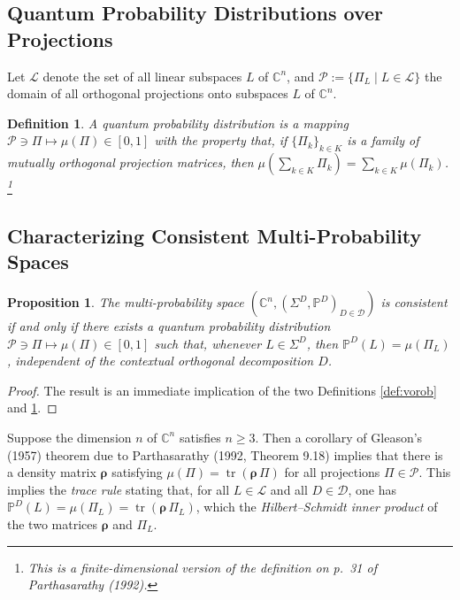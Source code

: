 \documentclass[11pt]{article}
\newcommand \C { \mathbb{C} }
\DeclareMathOperator{\tr}{tr}
\newtheorem{proposition}[theorem]{Proposition}
\newtheorem{definition}[theorem]{Definition}
\begin{document}
\subsection{Quantum Probability Distributions over Projections}

Let $ \mathcal L$ denote the set of all linear subspaces $L$ of $ \C^n $,
and $ \mathscr P := \{ \Pi _L \mid L \in \mathcal L \} $ the domain 
of all orthogonal projections onto subspaces $L$ of $ \C^n $.

\begin{definition} \label{def:quantProb}
A \emph{quantum probability distribution} is a mapping 
 \( \mathscr P \owns \Pi \mapsto \mu ( \Pi ) \in [0, 1] \) with the property that,
	if $ \{ \Pi _k \}_{k \in K} $ is a family of mutually orthogonal projection matrices, 
	then $ \mu \left( \sum _{k \in K} \Pi _k \right) = \sum _{k \in K} \mu ( \Pi _k ) $.%
%
\footnote{This is a finite-dimensional version
of the definition on p.~31 of Parthasarathy (1992).}
%
\end{definition}

\subsection{Characterizing Consistent Multi-Probability Spaces}

\begin{proposition}
	The multi-probability space \( ( \C^n, ( \Sigma ^D, \mathbb P^D )_{D \in \mathcal D}) \)
	is consistent if and only if there exists a quantum probability distribution
	 \( \mathscr P \owns \Pi \mapsto \mu ( \Pi ) \in [0, 1] \)
	such that, whenever $L \in \Sigma ^D $, then $ \mathbb P^D (L) = \mu ( \Pi _L )$,
	independent of the contextual orthogonal decomposition $D$.
\end{proposition}

\begin{proof}
	The result is an immediate implication 
	of the two Definitions \ref{def:vorob} and \ref{def:quantProb}.
\end{proof}

Suppose the dimension $n$ of $ \C^n $ satisfies $n \ge 3$.
Then a corollary of Gleason's (1957) theorem due to Parthasarathy (1992, Theorem 9.18)
implies that there is a density matrix $ \boldsymbol \rho $ 
satisfying $ \mu ( \Pi ) = \tr ( \boldsymbol \rho \, \Pi )$ 
for all projections $ \Pi \in \mathscr P$.
This implies the \emph{trace rule} stating that,
for all $L \in \mathcal L$ and all $D \in \mathcal D$, 
one has $ \mathbb P^D (L) = \mu ( \Pi _L ) = \tr ( \boldsymbol \rho \, \Pi _L ) $,
which the \emph{Hilbert--Schmidt inner product} 
of the two matrices $ \boldsymbol \rho $ and $ \Pi _L $.  
\end{document}
